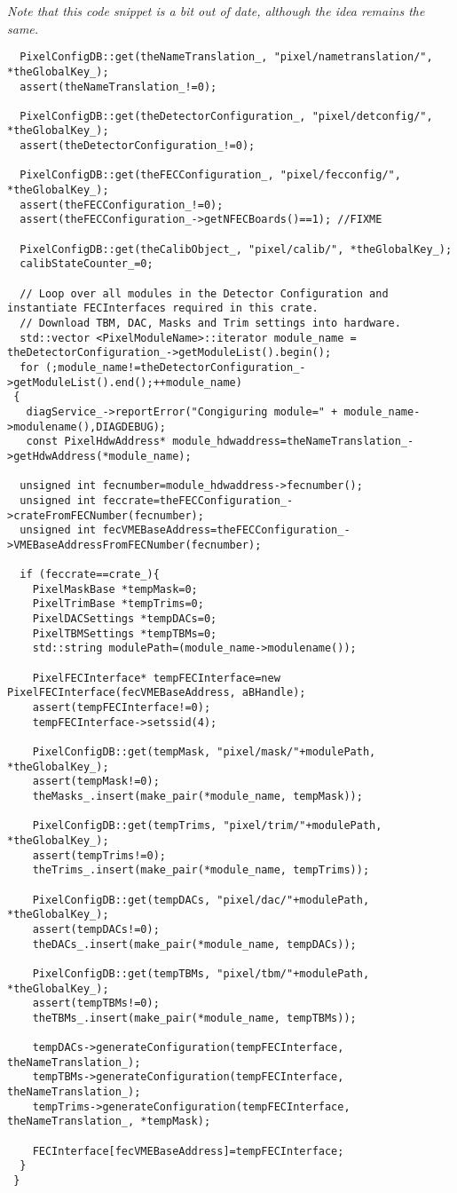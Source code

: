 {\it Note that this code snippet is a bit out of date, although the idea remains the same.}
\begin{verbatim}
  PixelConfigDB::get(theNameTranslation_, "pixel/nametranslation/", *theGlobalKey_);
  assert(theNameTranslation_!=0);

  PixelConfigDB::get(theDetectorConfiguration_, "pixel/detconfig/", *theGlobalKey_);
  assert(theDetectorConfiguration_!=0);

  PixelConfigDB::get(theFECConfiguration_, "pixel/fecconfig/", *theGlobalKey_);
  assert(theFECConfiguration_!=0);
  assert(theFECConfiguration_->getNFECBoards()==1); //FIXME

  PixelConfigDB::get(theCalibObject_, "pixel/calib/", *theGlobalKey_);
  calibStateCounter_=0;

  // Loop over all modules in the Detector Configuration and instantiate FECInterfaces required in this crate.
  // Download TBM, DAC, Masks and Trim settings into hardware.
  std::vector <PixelModuleName>::iterator module_name = theDetectorConfiguration_->getModuleList().begin();
  for (;module_name!=theDetectorConfiguration_->getModuleList().end();++module_name)
 {
   diagService_->reportError("Congiguring module=" + module_name->modulename(),DIAGDEBUG);
   const PixelHdwAddress* module_hdwaddress=theNameTranslation_->getHdwAddress(*module_name);

  unsigned int fecnumber=module_hdwaddress->fecnumber();
  unsigned int feccrate=theFECConfiguration_->crateFromFECNumber(fecnumber);
  unsigned int fecVMEBaseAddress=theFECConfiguration_->VMEBaseAddressFromFECNumber(fecnumber);

  if (feccrate==crate_){
    PixelMaskBase *tempMask=0;
    PixelTrimBase *tempTrims=0;
    PixelDACSettings *tempDACs=0;
    PixelTBMSettings *tempTBMs=0;
    std::string modulePath=(module_name->modulename());

    PixelFECInterface* tempFECInterface=new PixelFECInterface(fecVMEBaseAddress, aBHandle);
    assert(tempFECInterface!=0);
    tempFECInterface->setssid(4);

    PixelConfigDB::get(tempMask, "pixel/mask/"+modulePath, *theGlobalKey_);
    assert(tempMask!=0);
    theMasks_.insert(make_pair(*module_name, tempMask));

    PixelConfigDB::get(tempTrims, "pixel/trim/"+modulePath, *theGlobalKey_);
    assert(tempTrims!=0);
    theTrims_.insert(make_pair(*module_name, tempTrims));

    PixelConfigDB::get(tempDACs, "pixel/dac/"+modulePath, *theGlobalKey_);
    assert(tempDACs!=0);
    theDACs_.insert(make_pair(*module_name, tempDACs));

    PixelConfigDB::get(tempTBMs, "pixel/tbm/"+modulePath, *theGlobalKey_);
    assert(tempTBMs!=0);
    theTBMs_.insert(make_pair(*module_name, tempTBMs));

    tempDACs->generateConfiguration(tempFECInterface, theNameTranslation_);
    tempTBMs->generateConfiguration(tempFECInterface, theNameTranslation_);
    tempTrims->generateConfiguration(tempFECInterface, theNameTranslation_, *tempMask);

    FECInterface[fecVMEBaseAddress]=tempFECInterface;
  }
 }
\end{verbatim}

